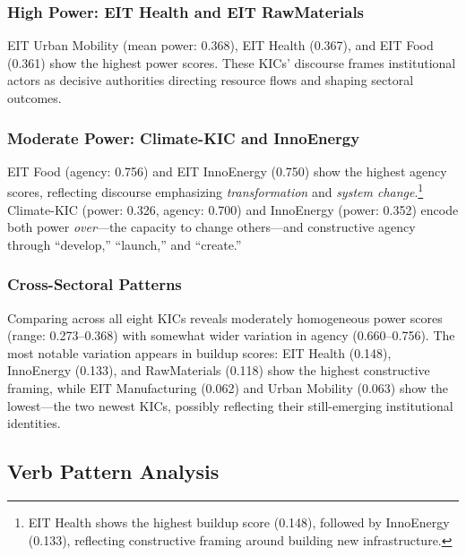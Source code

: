 \documentclass[../main.tex]{subfiles}
\begin{document}
\subsubsection{High Power: EIT Health and EIT RawMaterials}

EIT Urban Mobility (mean power: 0.368), EIT Health (0.367), and EIT Food (0.361) show the highest power scores. These KICs' discourse frames institutional actors as decisive authorities directing resource flows and shaping sectoral outcomes.

\subsubsection{Moderate Power: Climate-KIC and InnoEnergy}

EIT Food (agency: 0.756) and EIT InnoEnergy (0.750) show the highest agency scores, reflecting discourse emphasizing \textit{transformation} and \textit{system change}.\footnote{EIT Health shows the highest buildup score (0.148), followed by InnoEnergy (0.133), reflecting constructive framing around building new infrastructure.} Climate-KIC (power: 0.326, agency: 0.700) and InnoEnergy (power: 0.352) encode both power \textit{over}---the capacity to change others---and constructive agency through ``develop,'' ``launch,'' and ``create.''

\subsubsection{Cross-Sectoral Patterns}

Comparing across all eight KICs reveals moderately homogeneous power scores (range: 0.273--0.368) with somewhat wider variation in agency (0.660--0.756). The most notable variation appears in buildup scores: EIT Health (0.148), InnoEnergy (0.133), and RawMaterials (0.118) show the highest constructive framing, while EIT Manufacturing (0.062) and Urban Mobility (0.063) show the lowest---the two newest KICs, possibly reflecting their still-emerging institutional identities.

\subsection{Verb Pattern Analysis}
\end{document}
